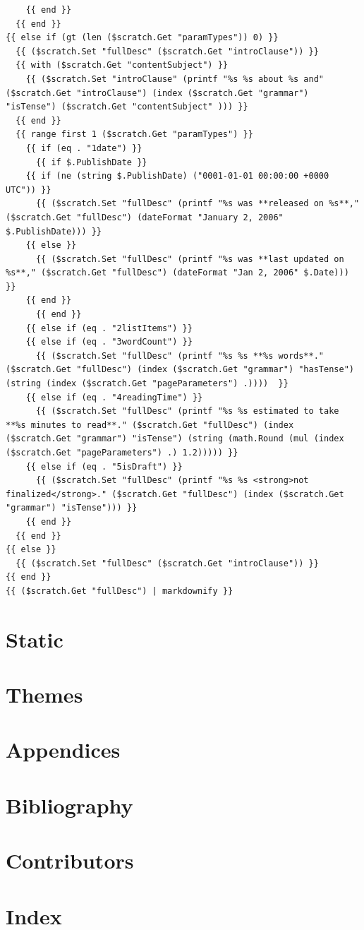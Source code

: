 \documentclass[11pt]{article}
\begin{document}
\begin{verbatim}
    {{ end }}
  {{ end }}
{{ else if (gt (len ($scratch.Get "paramTypes")) 0) }}
  {{ ($scratch.Set "fullDesc" ($scratch.Get "introClause")) }}
  {{ with ($scratch.Get "contentSubject") }}
    {{ ($scratch.Set "introClause" (printf "%s %s about %s and" ($scratch.Get "introClause") (index ($scratch.Get "grammar") "isTense") ($scratch.Get "contentSubject" ))) }}
  {{ end }}
  {{ range first 1 ($scratch.Get "paramTypes") }}
    {{ if (eq . "1date") }}
      {{ if $.PublishDate }}
	{{ if (ne (string $.PublishDate) ("0001-01-01 00:00:00 +0000 UTC")) }}
	  {{ ($scratch.Set "fullDesc" (printf "%s was **released on %s**," ($scratch.Get "fullDesc") (dateFormat "January 2, 2006" $.PublishDate))) }}
	{{ else }}
	  {{ ($scratch.Set "fullDesc" (printf "%s was **last updated on %s**," ($scratch.Get "fullDesc") (dateFormat "Jan 2, 2006" $.Date))) }}
	{{ end }}
      {{ end }}
    {{ else if (eq . "2listItems") }}
    {{ else if (eq . "3wordCount") }}
      {{ ($scratch.Set "fullDesc" (printf "%s %s **%s words**." ($scratch.Get "fullDesc") (index ($scratch.Get "grammar") "hasTense") (string (index ($scratch.Get "pageParameters") .))))  }}
    {{ else if (eq . "4readingTime") }}
      {{ ($scratch.Set "fullDesc" (printf "%s %s estimated to take **%s minutes to read**." ($scratch.Get "fullDesc") (index ($scratch.Get "grammar") "isTense") (string (math.Round (mul (index ($scratch.Get "pageParameters") .) 1.2))))) }}
    {{ else if (eq . "5isDraft") }}
      {{ ($scratch.Set "fullDesc" (printf "%s %s <strong>not finalized</strong>." ($scratch.Get "fullDesc") (index ($scratch.Get "grammar") "isTense"))) }}
    {{ end }}
  {{ end }}
{{ else }}
  {{ ($scratch.Set "fullDesc" ($scratch.Get "introClause")) }}
{{ end }}
{{ ($scratch.Get "fullDesc") | markdownify }}
\end{verbatim}
\section{Static}
\label{sec:org96100b2}
\section{Themes}
\label{sec:org6d2d743}
\section{Appendices}
\label{sec:orgaf04f0e}
\section{Bibliography}
\label{sec:orga9e60de}
\section{Contributors}
\label{sec:org6f37269}
\section{Index}
\label{sec:orgff861c7}
\end{document}
